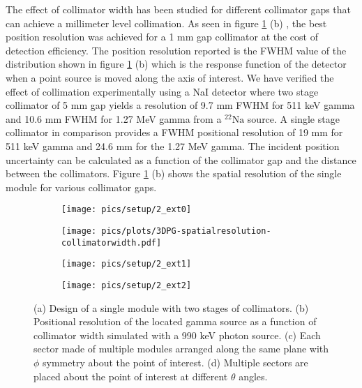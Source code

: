 \documentclass[11pt,a4paper]{article}
\begin{document}
The effect of collimator width has been studied for different collimator gaps that can achieve a millimeter level collimation. As seen in figure  \ref{fig_3D_singlemodule} (b) , the best position resolution was achieved for a 1 mm gap collimator at the cost of detection efficiency. The position resolution reported is the FWHM value of the distribution shown in figure  \ref{fig_3D_singlemodule} (b) which is the response function of the detector when a point source is moved along the axis of interest.  We have verified the effect of collimation experimentally using a NaI detector where two stage collimator of 5 mm gap yields a resolution of 9.7 mm FWHM for 511 keV gamma and 10.6 mm FWHM for 1.27 MeV gamma from a $\mathrm{^{22}Na}$ source. A single stage collimator in comparison provides a FWHM positional resolution of 19 mm for 511 keV gamma and 24.6 mm for the 1.27 MeV gamma.   The incident position uncertainty can be calculated as a function of the collimator gap and the distance between the collimators. Figure \ref{fig_3D_singlemodule} (b) shows the spatial resolution of the single module for various collimator gaps.



\begin{figure}[h]  
\centering
	\begin{subfigure}[b]{0.49\textwidth} %
	\centering
	\texttt{[image: pics/setup/2\_ext0]}
	\caption{}
	\end{subfigure}
	\hfill
    \hspace{0.00\textwidth} %
	\begin{subfigure}[b]{0.4\textwidth} %
	\centering
	\texttt{[image: pics/plots/3DPG-spatialresolution-collimatorwidth.pdf]}
	\caption{}
	\end{subfigure}
	\hfill
	\begin{subfigure}[b]{0.49\textwidth} %
	\centering
	\texttt{[image: pics/setup/2\_ext1]}
	\caption{}
	\end{subfigure}\label{fig_3D_sector}
	\hfill
    \hspace{0.00\textwidth} %
	\begin{subfigure}[b]{0.49\textwidth} %
	\centering
	\texttt{[image: pics/setup/2\_ext2]}
	\caption{}
	\end{subfigure}\label{fig_3D_sector}
	\hfill
\caption{(a) Design of a single module with two stages of collimators. (b) Positional resolution of the located gamma source as a function of collimator width simulated with a 990 keV photon source. (c) Each sector made of multiple modules arranged along the same plane with $\phi$ symmetry about the point of interest. (d) Multiple sectors are placed about the point of interest at different $\theta$ angles.}
\label{fig_3D_singlemodule}
\end{figure}
\end{document}
